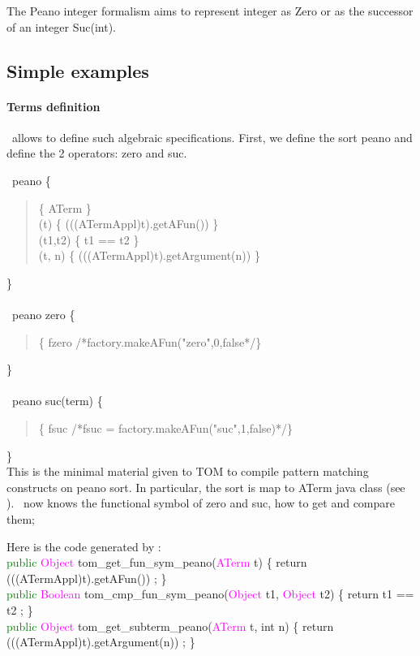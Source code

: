 The Peano integer formalism aims to represent integer as Zero or as the
successor of an integer Suc(int).

\subsection{Simple examples}
\paragraph{Terms definition}
\TOM\ allows to define such algebraic specifications. First, we define
the sort \textsf{peano} and define the 2 operators: \textsf{zero} and \textsf{suc}.

\typeterm\ peano \{\\
\begin{quote}
 \implement           \{ ATerm \}\\
 \getfs(t)      \{ (((ATermAppl)t).getAFun()) \}\\
 \cmpfs(t1,t2)  \{ t1 == t2 \}\\
 \getsub(t, n)   \{ (((ATermAppl)t).getArgument(n)) \}\\
\end{quote}
\}\\
\\
\op\ peano zero \{\\
\begin{quote}
\fsym \{ fzero /*factory.makeAFun("zero",0,false*/\}\\
\end{quote}
\}\\
\\
\op\ peano suc(term) \{\\
\begin{quote}
  \fsym \{ fsuc /*fsuc  = factory.makeAFun("suc",1,false)*/\}\\
\end{quote}
\}\\

This is the minimal material given to TOM to compile pattern matching
constructs on peano sort. In particular, the sort is map to ATerm java class
(see \implement). \TOM\ now knows the functional symbol of zero and
suc, how to get and compare them;

Here is the code generated by \TOM:
\\ \textcolor{green}{public} \textcolor{magenta}{Object} \textsf{tom\_get\_fun\_sym\_peano}(\textcolor{magenta}{ATerm} t) \{ return  (((ATermAppl)t).getAFun()) ; \}
\\ \textcolor{green}{public} \textcolor{magenta}{Boolean} \textsf{tom\_cmp\_fun\_sym\_peano}(\textcolor{magenta}{Object} t1, \textcolor{magenta}{Object} t2) \{ return  t1 == t2 ; \}
\\ \textcolor{green}{public} \textcolor{magenta}{Object} \textsf{tom\_get\_subterm\_peano}(\textcolor{magenta}{ATerm} t, int n) \{ return
   (((ATermAppl)t).getArgument(n)) ; \}

